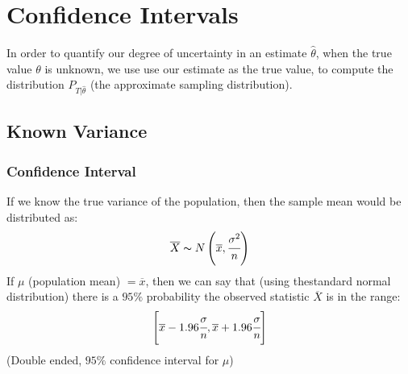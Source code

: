 \documentclass{report}
\begin{document}
\section*{Confidence Intervals}
In order to quantify our degree of uncertainty in an estimate $\hat{\theta}$, when the true value $\theta$ is unknown, we use use our estimate as the true value, to compute the distribution $P_{T|\hat{\theta}}$ (the approximate sampling distribution).
\subsection*{Known Variance}
\subsubsection*{Confidence Interval}
If we know the true variance of the population, then the sample mean would be distributed as:
\[\overline{X} \thicksim N\left(\overline{x}, \cfrac{\sigma^2}{n} \right)\]
If $\mu$ (population mean) $= \overline{x}$, then we can say that (using thestandard normal distribution) there is a $95\%$ probability the observed statistic $\overline{X}$ is in the range:
\[\left[\overline{x} - 1.96\cfrac{\sigma}{n}, \overline{x} + 1.96\cfrac{\sigma}{n} \right]\]
(Double ended, $95\%$ confidence interval for $\mu$)
\end{document}
